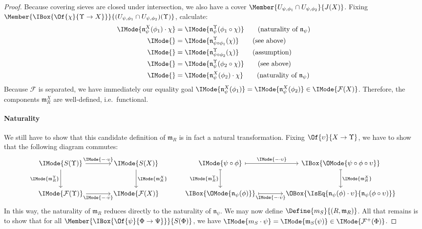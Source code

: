 \documentclass{article}
\newcommand\AIsEq[2]{\IMode{#1} &=\IMode{#2}}
\newcommand\Plus[1]{{#1}^+}
\newcommand\IsEqIn[3]{\IMode{#1}=\IMode{#2}\in\IMode{#3}}
\begin{document}
\begin{proof}
  Because covering sieves are closed under intersection, we also have
  a cover $\Member{U_{\psi,\phi_1}\cap U_{\psi,\phi_2}}{J(X)}$. Fixing
  $\Member{\IBox{\Of{\chi}{\Upsilon\to X}}}{(U_{\psi,\phi_1}\cap
    U_{\psi,\phi_2})(\Upsilon)}$, calculate:
  \begin{align*}
    \AIsEq{
      \mathfrak{n}_\psi^X(\phi_1)\cdot \chi
    }{
      \mathfrak{n}_\psi^\Upsilon(\phi_1\circ\chi)
    }
    \tag{naturality of $\mathfrak{n}_\psi$}
    \\
    \AIsEq{
    }{
      \mathfrak{n}_{\psi\circ\phi_1}^\Upsilon(\chi)
    }
    \tag{see above}
    \\
    \AIsEq{
    }{
      \mathfrak{n}_{\psi\circ\phi_2}^\Upsilon(\chi)
    }
    \tag{assumption}
    \\
    \AIsEq{
    }{
      \mathfrak{n}_\psi^\Upsilon(\phi_2\circ\chi)
    }
    \tag{see above}
    \\
    \AIsEq{
    }{
      \mathfrak{n}_\psi^X(\phi_2)\cdot\chi
    }
    \tag{naturality of $\mathfrak{n}_\psi$}
  \end{align*}
  Because $\mathcal{F}$ is separated, we have immediately our equality
  goal
  $\IsEqIn{\mathfrak{n}_\psi^X(\phi_1)}{\mathfrak{n}_\psi^X(\phi_2)}{\mathcal{F}(X)}$. Therefore,
  the components $\mathfrak{m}_R^X$ are well-defined, i.e.\ functional.

  \paragraph{Naturality}
  We still have to show that this candidate definition of
  $\mathfrak{m}_R$ is in fact a natural transformation. Fixing
  $\Of{\upsilon}{X\to\Upsilon}$, we have to show that the following
  diagram commutes:
  \[
    \begin{tikzcd}[sep=large]
      \IMode{S(\Upsilon)} \arrow[r,"\IMode{-\cdot\upsilon}"]
      \arrow[d,swap,"\IMode{\mathfrak{m}_R^\Upsilon}"] & \IMode{S(X)}
      \arrow[d,"\IMode{\mathfrak{m}_R^X}"]
      \\
      \IMode{\mathcal{F}(\Upsilon)} \arrow[r,swap,"\IMode{-\cdot\upsilon}"] &
      \IMode{\mathcal{F}(X)}
    \end{tikzcd}
    \qquad
    \begin{tikzcd}[sep=large]
      \IMode{\psi\circ\phi} \arrow[r,mapsto,"\IMode{-\cdot\upsilon}"]
      \arrow[d,mapsto,swap,"\IMode{\mathfrak{m}_R^\Upsilon}"] &
      \IBox{\OMode{\psi\circ\phi\circ\upsilon}}
      \arrow[d,mapsto,"\IMode{\mathfrak{m}_R^X}"]
      \\
      \IBox{\OMode{\mathfrak{n}_\psi(\phi)}}
      \arrow[r,mapsto,swap,"\IMode{-\cdot\upsilon}"] &
      \OBox{\IsEq{\mathfrak{n}_\psi(\phi)\cdot\upsilon}{\mathfrak{n}_\psi(\phi\circ\upsilon)}}
    \end{tikzcd}
  \]
  In this way, the naturality of $\mathfrak{m}_R$ reduces directly to
  the naturality of $\mathfrak{n}_\psi$. We may now define
  $\Define{m_S}{(R,\mathfrak{m}_R)}$.
%
  All that remains is to show that for all
  $\Member{\IBox{\Of{\psi}{\Phi\to\Psi}}}{S(\Phi)}$, we have
  $\IsEqIn{m_S\cdot\psi}{\mathfrak{m}_S(\psi)}{\Plus{\mathcal{F}}(\Phi)}$.


\end{proof}
\end{document}
